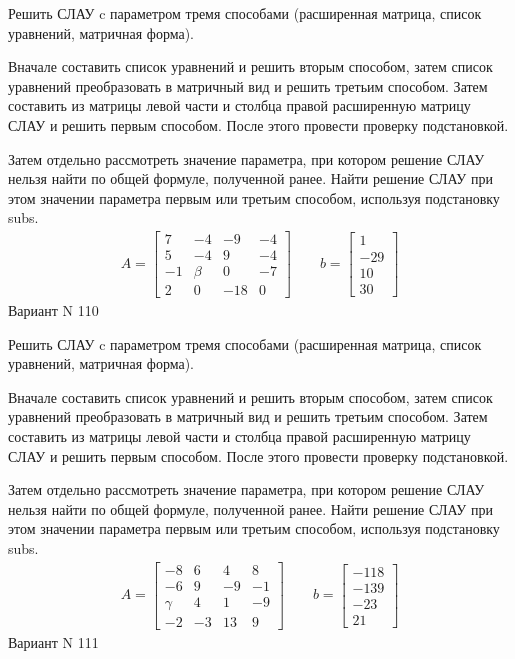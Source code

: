 \documentclass[11pt]{report}
\begin{document}
Решить СЛАУ c параметром тремя способами (расширенная матрица, список уравнений, матричная форма).

Вначале составить список уравнений и решить вторым способом,
затем список уравнений преобразовать в матричный вид и решить третьим способом.
Затем составить из матрицы левой части и столбца правой расширенную матрицу СЛАУ и решить первым способом.
После этого провести проверку подстановкой.

Затем отдельно рассмотреть значение параметра, при котором решение СЛАУ нельзя найти по общей формуле,
полученной ранее.
Найти решение СЛАУ при этом значении параметра первым или третьим способом, используя подстановку subs.
\begin{align*}
    A = \left[\begin{matrix}7 & -4 & -9 & -4\\5 & -4 & 9 & -4\\-1 & \beta & 0 & -7\\2 & 0 & -18 & 0\end{matrix}\right]
\qquad b = \left[\begin{matrix}1\\-29\\10\\30\end{matrix}\right]
\end{align*}
\newpage
Вариант N 110


Решить СЛАУ c параметром тремя способами (расширенная матрица, список уравнений, матричная форма).

Вначале составить список уравнений и решить вторым способом,
затем список уравнений преобразовать в матричный вид и решить третьим способом.
Затем составить из матрицы левой части и столбца правой расширенную матрицу СЛАУ и решить первым способом.
После этого провести проверку подстановкой.

Затем отдельно рассмотреть значение параметра, при котором решение СЛАУ нельзя найти по общей формуле,
полученной ранее.
Найти решение СЛАУ при этом значении параметра первым или третьим способом, используя подстановку subs.
\begin{align*}
    A = \left[\begin{matrix}-8 & 6 & 4 & 8\\-6 & 9 & -9 & -1\\\gamma & 4 & 1 & -9\\-2 & -3 & 13 & 9\end{matrix}\right]
\qquad b = \left[\begin{matrix}-118\\-139\\-23\\21\end{matrix}\right]
\end{align*}
\newpage
Вариант N 111
\end{document}
